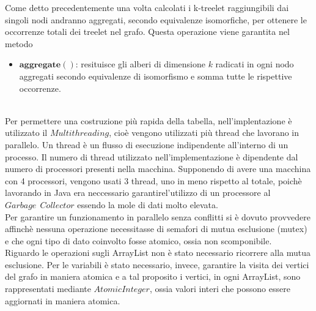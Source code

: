 Come detto precedentemente una volta calcolati i k-treelet raggiungibili dai singoli nodi andranno aggregati, secondo equivalenze isomorfiche, per ottenere le occorrenze totali dei treelet nel grafo.
Questa operazione viene garantita nel metodo
\begin{itemize}
	\item $ \textbf{aggregate}() $: resituisce gli alberi di dimensione $ k $ radicati in ogni nodo aggregati secondo equivalenze di isomorfismo e somma tutte le rispettive occorrenze.  
\end{itemize}\mbox{}\\
Per permettere una costruzione pi\`u rapida della tabella, nell'implentazione \`e utilizzato il $ Multithreading $, cio\`e vengono utilizzati pi\`u thread che lavorano in parallelo.
Un thread \`e un flusso di esecuzione indipendente all'interno di un processo.
Il numero di thread utilizzato nell'implementazione \`e dipendente dal numero di processori presenti nella macchina.
Supponendo di avere una macchina con 4 processori, vengono usati 3 thread, uno in meno rispetto al totale, poich\`e lavorando in Java era neccessario garantirel'utilizzo di un processore al $ Garbage \ \  Collector $ essendo la mole di dati molto elevata.\\
Per garantire un funzionamento in parallelo senza conflitti si \`e dovuto provvedere affinch\`e nessuna operazione necessitasse di semafori di mutua esclusione (mutex) e che ogni tipo di dato coinvolto fosse atomico, ossia non scomponibile.\\
Riguardo le operazioni sugli ArrayList non \`e stato necessario ricorrere alla mutua esclusione.
Per le variabili \`e stato necessario, invece, garantire la visita dei vertici del grafo in maniera atomica e a tal proposito i vertici, in ogni ArrayList, sono rappresentati mediante $ AtomicInteger $, ossia valori interi che possono essere aggiornati in maniera atomica.\mbox{}\\



	

